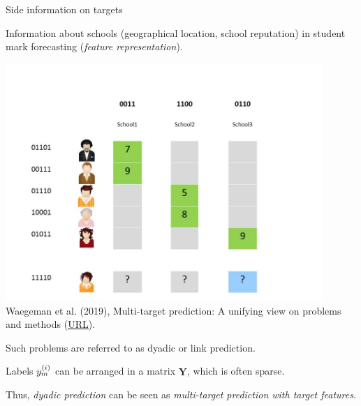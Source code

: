 \documentclass[11pt,compress,t,notes=noshow, xcolor=table]{beamer}
\begin{document}
\begin{vbframe}{Side information on targets}
\begin{itemize}
            \begin{minipage}{0.45\textwidth}    
                \item Information about schools (geographical location, school reputation) in student mark forecasting (\emph{feature representation}).
            \end{minipage}
            \hfill
            \begin{minipage}{0.4\textwidth}    
                \begin{center}	                                     
                    \includegraphics[width=0.9\textwidth,trim = 0 0 100 20,clip]{figure/Slide6} \tiny
                    \\ Waegeman et al. (2019), Multi-target prediction: A unifying view on problems and methods (\href{https://arxiv.org/pdf/1809.02352.pdf}{\underline{URL}}).	
                \end{center}
            \end{minipage}
        
        \item Such problems are referred to as dyadic or link  prediction.
        
        
        \item Labels $y^{(i)}_m$ can be arranged in a matrix $\bm{Y}$, which is often sparse. 
        
        \item Thus, \emph{dyadic prediction} can be seen as \emph{multi-target prediction with target features}. 
    \end{itemize}
\end{vbframe}
\end{document}

